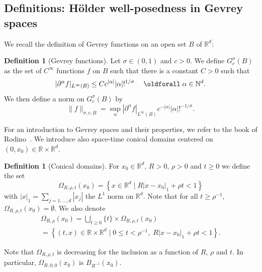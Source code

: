 \documentclass[10pt]{amsart}
\theoremstyle{definition}
\newtheorem{defi}[cdrthm]{Definition}
\theoremstyle{plain}
\newcommand*\R{{\mathbb R}}
\newcommand*\N{{\mathbb N}}
\newcommand{\dptl}{\partial}%
\newcommand{\alf}{\alpha}%
\renewcommand*{\forall}{\mathrel{\oldforall}}
\begin{document}
\subsection{Definitions: H\"older well-posedness in Gevrey spaces}\label{1.subsection.definitions}



We recall the definition of Gevrey functions on an open set $B$ of $\R^{d}$:

\begin{defi}[Gevrey functions]\label{1.def.gevrey}
Let $\sigma\in(0,1)$ and $c>0$. We define $G^{\sigma}_{c}(B)$ as the set of $C^{\infty}$ functions $f$ on $B$ such that there is a constant $C>0$ such that
\begin{equation}
|\dptl^{\alf} f|_{L^{\infty}(B)} \leq C c^{|\alf|} |\alf|!^{1/\sigma} \quad \forall \alf \in\N^{d}.
\end{equation}
\noindent We then define a norm on $G^{\sigma}_{c}(B)$ by
\begin{equation}
\|f\|_{\sigma,c,B} = \sup_{\alf} |\dptl^{\alf} f|_{L^{\infty}(B)}c^{-|\alf|}|\alf|!^{-1/\sigma}.
\end{equation}
\end{defi}

For an introduction to Gevrey spaces and their properties, we refer to the book of Rodino~\cite{rodino1993linear}. We introduce also space-time conical domains centered on\linebreak $(0,x_0)\in\R\times\R^{d}$.

\begin{defi}[Conical domains]\label{1.defi.conical}
For $x_0\in\R^{d}$, $R>0$, $\rho>0$ and $t\geq 0$ we define the set
\begin{equation}\label{1.defi.Omega.t}
\Omega_{R,\rho,t}(x_0) = \left\{x \in\R^{d} \;\Big|\; R |x-x_0|_{1} + \rho t <1 \right\}
\end{equation}
with $|x|_{1} = \sum_{j=1,\ldots,d} |x_j|$ the $L^{1}$ norm on $\R^{d}$. Note that for all $t \geq \rho^{-1}$, $\Omega_{R,\rho,t}(x_0) = \emptyset$. We also denote
\begin{multline}\label{1.defi.Omega}
\Omega_{R,\rho}(x_0)= \bigcup_{t\geq 0} \{t\}\times\Omega_{R,\rho,t}(x_0)\\
= \left\{(t,x) \in\R\times\R^{d} \;\Big|\; 0\leq t < \rho^{-1},\; R |x-x_0|_{1} + \rho t <1 \right\}.
\end{multline}
\end{defi}

Note that $\Omega_{R,\rho,t}$ is decreasing for the inclusion as a function of $R$, $\rho$ and $t$. In particular, $\Omega_{R,0,0}(x_0)$ is $B_{R^{-1}}(x_0)$.
\end{document}

